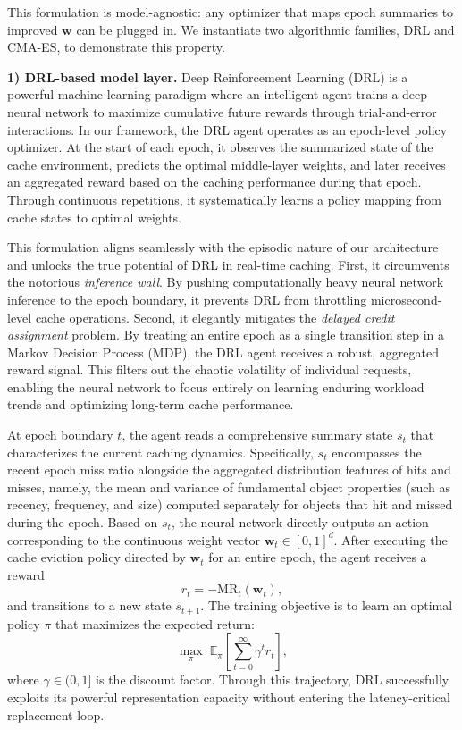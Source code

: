 \documentclass[10pt,journal]{IEEEtran}
\theoremstyle{slantedlemma}
\begin{document}
This formulation is model-agnostic: any optimizer that maps
epoch summaries to improved $\mathbf{w}$ can be plugged in. We instantiate two
algorithmic families, DRL and CMA-ES, to demonstrate this property.

\textbf{1) DRL-based model layer.}
Deep Reinforcement Learning (DRL) is a powerful machine learning paradigm where an intelligent agent trains a deep neural network to maximize cumulative future rewards through trial-and-error interactions. In our framework, the DRL agent operates as an epoch-level policy optimizer. At the start of each epoch, it observes the summarized state of the cache environment, predicts the optimal middle-layer weights, and later receives an aggregated reward based on the caching performance during that epoch. Through continuous repetitions, it systematically learns a policy mapping from cache states to optimal weights.

This formulation aligns seamlessly with the episodic nature of our architecture and unlocks the true potential of DRL in real-time caching. First, it circumvents the notorious \emph{inference wall}. By pushing computationally heavy neural network inference to the epoch boundary, it prevents DRL from throttling microsecond-level cache operations. Second, it elegantly mitigates the \emph{delayed credit assignment} problem. By treating an entire epoch as a single transition step in a Markov Decision Process (MDP), the DRL agent receives a robust, aggregated reward signal. This filters out the chaotic volatility of individual requests, enabling the neural network to focus entirely on learning enduring workload trends and optimizing long-term cache performance.

At epoch boundary $t$, the agent reads a comprehensive summary state $s_t$ that characterizes the current caching dynamics. Specifically, $s_t$ encompasses the recent epoch miss ratio alongside the aggregated distribution features of hits and misses, namely, the mean and variance of fundamental object properties (such as recency, frequency, and size) computed separately for objects that hit and missed during the epoch. Based on $s_t$, the neural network directly outputs an action corresponding to the continuous weight vector $\mathbf{w}_t \in [0,1]^d$. After executing the cache eviction policy directed by $\mathbf{w}_t$ for an entire epoch, the agent receives a reward
\begin{equation}
r_t = -\mathrm{MR}_t(\mathbf{w}_t),
\label{eq:drl-reward}
\end{equation}
and transitions to a new state $s_{t+1}$. The training objective is to learn an optimal policy $\pi$ that maximizes the expected return:
\begin{equation}
\max_{\pi}\; \mathbb{E}_{\pi}\!\left[\sum_{t=0}^{\infty}\gamma^t r_t\right],
\label{eq:drl-objective}
\end{equation}
where $\gamma \in (0,1]$ is the discount factor. Through this trajectory, DRL successfully exploits its powerful representation capacity without entering the latency-critical replacement loop.
\end{document}
